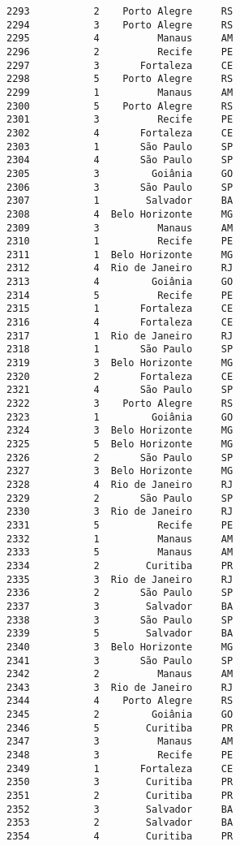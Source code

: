 \documentclass[11pt]{article}
\begin{document}
\begin{Verbatim}[commandchars=\\\{\}]
2293           2    Porto Alegre     RS  
2294           3    Porto Alegre     RS  
2295           4          Manaus     AM  
2296           2          Recife     PE  
2297           3       Fortaleza     CE  
2298           5    Porto Alegre     RS  
2299           1          Manaus     AM  
2300           5    Porto Alegre     RS  
2301           3          Recife     PE  
2302           4       Fortaleza     CE  
2303           1       São Paulo     SP  
2304           4       São Paulo     SP  
2305           3         Goiânia     GO  
2306           3       São Paulo     SP  
2307           1        Salvador     BA  
2308           4  Belo Horizonte     MG  
2309           3          Manaus     AM  
2310           1          Recife     PE  
2311           1  Belo Horizonte     MG  
2312           4  Rio de Janeiro     RJ  
2313           4         Goiânia     GO  
2314           5          Recife     PE  
2315           1       Fortaleza     CE  
2316           4       Fortaleza     CE  
2317           1  Rio de Janeiro     RJ  
2318           1       São Paulo     SP  
2319           3  Belo Horizonte     MG  
2320           2       Fortaleza     CE  
2321           4       São Paulo     SP  
2322           3    Porto Alegre     RS  
2323           1         Goiânia     GO  
2324           3  Belo Horizonte     MG  
2325           5  Belo Horizonte     MG  
2326           2       São Paulo     SP  
2327           3  Belo Horizonte     MG  
2328           4  Rio de Janeiro     RJ  
2329           2       São Paulo     SP  
2330           3  Rio de Janeiro     RJ  
2331           5          Recife     PE  
2332           1          Manaus     AM  
2333           5          Manaus     AM  
2334           2        Curitiba     PR  
2335           3  Rio de Janeiro     RJ  
2336           2       São Paulo     SP  
2337           3        Salvador     BA  
2338           3       São Paulo     SP  
2339           5        Salvador     BA  
2340           3  Belo Horizonte     MG  
2341           3       São Paulo     SP  
2342           2          Manaus     AM  
2343           3  Rio de Janeiro     RJ  
2344           4    Porto Alegre     RS  
2345           2         Goiânia     GO  
2346           5        Curitiba     PR  
2347           3          Manaus     AM  
2348           3          Recife     PE  
2349           1       Fortaleza     CE  
2350           3        Curitiba     PR  
2351           2        Curitiba     PR  
2352           3        Salvador     BA  
2353           2        Salvador     BA  
2354           4        Curitiba     PR  

\end{Verbatim}
\end{document}
